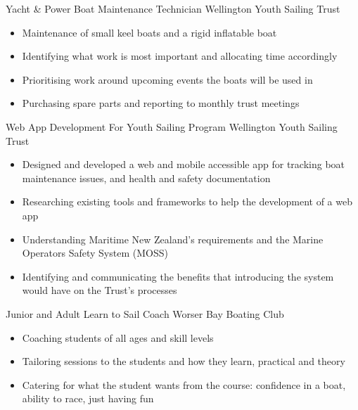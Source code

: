 \documentclass[a4paper]{template} %
\begin{document}
\begin{workexperience}
    {Yacht \& Power Boat Maintenance Technician}
    {Wellington Youth Sailing Trust}
    {
        \begin{itemize}
            \item Maintenance of small keel boats and a rigid inflatable boat
            \item Identifying what work is most important and allocating time accordingly
            \item Prioritising work around upcoming events the boats will be used in
            \item Purchasing spare parts and reporting to monthly trust meetings
        \end{itemize}
    }

    {Web App Development For Youth Sailing Program}
    {Wellington Youth Sailing Trust}
    {
        \begin{itemize}
            \item Designed and developed a web and mobile accessible app for tracking boat maintenance issues, and health and safety documentation
            \item Researching existing tools and frameworks to help the development of a web app
            \item Understanding Maritime New Zealand's requirements and the Marine Operators Safety System (MOSS)
            \item Identifying and communicating the benefits that introducing the system would have on the Trust's processes
        \end{itemize}
    }

    {Junior and Adult Learn to Sail Coach}
    {Worser Bay Boating Club}
    {
        \begin{itemize}
            \item Coaching students of all ages and skill levels
            \item Tailoring sessions to the students and how they learn, practical and theory
            \item Catering for what the student wants from the course: confidence in a boat, ability to race, just having fun
        \end{itemize}
    }

\end{workexperience}


\end{document}
